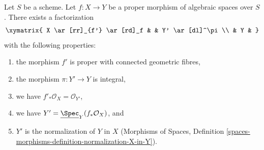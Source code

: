 %
\begin{theorem}
\label{theorem-stein-factorization-general}
Let $S$ be a scheme. Let $f : X \to Y$ be a proper morphism of algebraic
spaces over $S$. There exists a factorization
$$
\xymatrix{
X \ar[rr]_{f'} \ar[rd]_f & & Y' \ar[dl]^\pi \\
& Y &
}
$$
with the following properties:
\begin{enumerate}
\item the morphism $f'$ is proper with connected geometric fibres,
\item the morphism $\pi : Y' \to Y$ is integral,
\item we have $f'_*\mathcal{O}_X = \mathcal{O}_{Y'}$,
\item we have $Y' = \underline{\Spec}_Y(f_*\mathcal{O}_X)$, and
\item $Y'$ is the normalization of $Y$ in $X$ (Morphisms of Spaces, Definition
\ref{spaces-morphisms-definition-normalization-X-in-Y}).
\end{enumerate}
\end{theorem}

